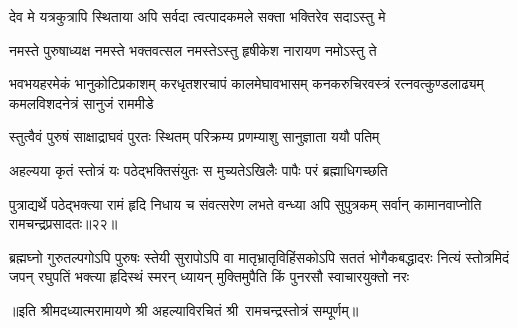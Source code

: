 \twolineshloka
{देव मे यत्रकुत्रापि स्थिताया अपि सर्वदा}
{त्वत्पादकमले सक्ता भक्तिरेव  सदाऽस्तु मे}%

\twolineshloka
{नमस्ते पुरुषाध्यक्ष नमस्ते भक्तवत्सल}
{नमस्तेऽस्तु हृषीकेश नारायण नमोऽस्तु ते}%

\fourlineindentedshloka
{भवभयहरमेकं भानुकोटिप्रकाशम्}
{करधृतशरचापं कालमेघावभासम्}
{कनकरुचिरवस्त्रं रत्नवत्कुण्डलाढ्यम्}
{कमलविशदनेत्रं सानुजं राममीडे}%

\twolineshloka
{स्तुत्वैवं पुरुषं साक्षाद्राघवं पुरतः स्थितम्}
{परिक्रम्य प्रणम्याशु सानुज्ञाता ययौ पतिम्}%

\twolineshloka
{अहल्यया कृतं स्तोत्रं यः पठेद्भक्तिसंयुतः}
{स मुच्यतेऽखिलैः पापैः परं ब्रह्माधिगच्छति}%

\twolineshloka
{पुत्राद्यर्थे पठेद्भक्त्या रामं हृदि निधाय च}
{संवत्सरेण लभते वन्ध्या अपि सुपुत्रकम्}%
{सर्वान् कामानवाप्नोति रामचन्द्रप्रसादतः॥२२॥}%

\fourlineindentedshloka
{ब्रह्मघ्नो गुरुतल्पगोऽपि पुरुषः स्तेयी सुरापोऽपि वा}
{मातृभ्रातृविहिंसकोऽपि सततं भोगैकबद्धादरः}
{नित्यं स्तोत्रमिदं जपन्  रघुपतिं भक्त्या हृदिस्थं स्मरन्}
{ध्यायन् मुक्तिमुपैति किं पुनरसौ स्वाचारयुक्तो नरः}%

॥इति श्रीमदध्यात्मरामायणे श्री अहल्याविरचितं श्री~रामचन्द्रस्तोत्रं सम्पूर्णम्॥